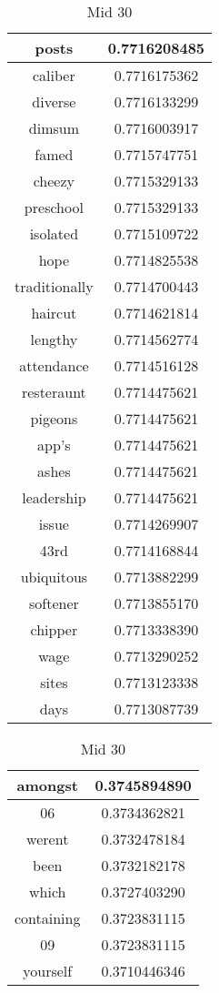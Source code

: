 \documentclass{article}
\begin{document}
\begin{table}[ht]
{\begin{tabular}{|c|c|}
\hline
posts & 0.7716208485 \\
\hline
caliber & 0.7716175362 \\
\hline
diverse & 0.7716133299 \\
\hline
dimsum & 0.7716003917 \\
\hline
famed & 0.7715747751 \\
\hline
cheezy & 0.7715329133 \\
\hline
preschool & 0.7715329133 \\
\hline
isolated & 0.7715109722 \\
\hline
hope & 0.7714825538 \\
\hline
traditionally & 0.7714700443 \\
\hline
haircut & 0.7714621814 \\
\hline
lengthy & 0.7714562774 \\
\hline
attendance & 0.7714516128 \\
\hline
resteraunt & 0.7714475621 \\
\hline
pigeons & 0.7714475621 \\
\hline
app's & 0.7714475621 \\
\hline
ashes & 0.7714475621 \\
\hline
leadership & 0.7714475621 \\
\hline
issue & 0.7714269907 \\
\hline
43rd & 0.7714168844 \\
\hline
ubiquitous & 0.7713882299 \\
\hline
softener & 0.7713855170 \\
\hline
chipper & 0.7713338390 \\
\hline
wage & 0.7713290252 \\
\hline
sites & 0.7713123338 \\
\hline
days & 0.7713087739 \\
\hline
\end{tabular}
\caption{Mid 30}
}
\hfill
\parbox{.21\linewidth}{
\centering
\begin{tabular}{|c|c|}
\hline
amongst & 0.3745894890 \\
\hline
06 & 0.3734362821 \\
\hline
werent & 0.3732478184 \\
\hline
been & 0.3732182178 \\
\hline
which & 0.3727403290 \\
\hline
containing & 0.3723831115 \\
\hline
09 & 0.3723831115 \\
\hline
yourself & 0.3710446346 \\

\end{tabular}}
\end{table}
\end{document}
